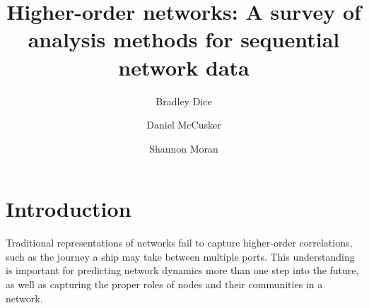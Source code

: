 \documentclass[sigconf]{acmart}
\begin{document}
\title{Higher-order networks: A survey of analysis methods for sequential network data}

\author{Bradley Dice}

\author{Daniel McCusker}

\author{Shannon Moran}

\renewcommand{\shortauthors}{Dice, et al.}




\maketitle

\section{Introduction}
Traditional representations of networks fail to capture higher-order correlations, such as the journey a ship may take between multiple ports. This understanding is important for predicting network dynamics more than one step into the future, as well as capturing the proper roles of nodes and their communities in a network.
\end{document}
